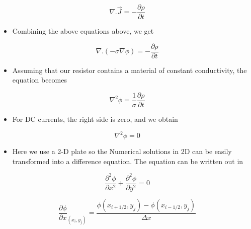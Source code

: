 \documentclass[11pt, a4paper]{article}
\begin{document}
    \begin{equation}
    \nabla.\vec{J} = -\frac{\partial \rho}{\partial t}
       \end{equation}
    
    \begin{itemize}
    \item
      Combining the above equations above, we get
    \end{itemize}
    
    \begin{equation}
    \nabla.(-\sigma\nabla\phi) = -\frac{\partial \rho}{\partial t}
       \end{equation}
    
    \begin{itemize}
    \item
      Assuming that our resistor contains a material of constant
      conductivity, the equation becomes
    \end{itemize}
    
    \begin{equation}
    \nabla^{2}\phi = \frac{1}{\sigma}\frac{\partial \rho}{\partial t}
       \end{equation}
    
    \begin{itemize}
    \item
      For DC currents, the right side is zero, and we obtain
    \end{itemize}
    
    \begin{equation}
    \nabla^{2}\phi = 0
       \end{equation}
    
    \begin{itemize}
    \item
      Here we use a 2-D plate so the Numerical solutions in 2D can be easily
      transformed into a difference equation. The equation can be written
      out in
    \end{itemize}
    
    \begin{equation}
    \frac{\partial^{2} \phi}{\partial x^{2}}+ \frac{\partial^{2} \phi}{\partial y^{2}} = 0
     \end{equation}
    
    \begin{equation}
    \frac{\partial \phi}{\partial x}_{(x_i,y_j)} = \frac{\phi(x_{i+1/2},y_j) - \phi(x_{i-1/2},y_j)}{\Delta x}
     \end{equation}
    
\end{document}
